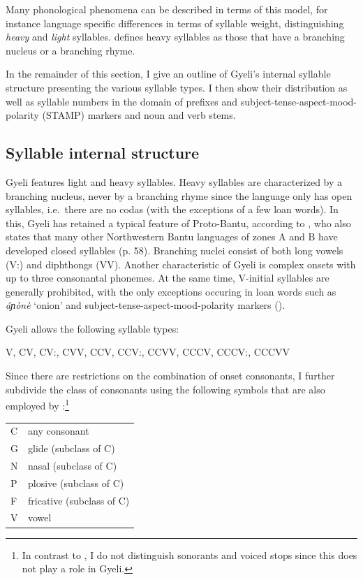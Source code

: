 Many phonological phenomena can be described in terms of this model, for instance language specific differences in terms of syllable weight, distinguishing {\itshape heavy} and {\itshape light} syllables. \citet{hyman85} defines heavy syllables as those that have a branching nucleus or a branching rhyme.

In the remainder of this section, I give an outline of Gyeli's internal syllable structure presenting the various syllable types. I then show their distribution as well as syllable numbers in the domain of prefixes and subject-tense-aspect-mood-polarity (STAMP) markers and noun and verb stems.


\subsection{Syllable internal structure}
\label{sec:SyllIntStr}

Gyeli features light and heavy syllables. Heavy syllables are characterized by a branching nucleus, never by a branching rhyme since the language only has open syllables, i.e.\ there are no codas (with the exceptions of a few loan words). In this, Gyeli has retained a typical feature of Proto-Bantu, according to \citet[43]{hyman2003}, who also states that many other Northwestern Bantu languages of zones A and B have developed closed syllables (p. 58).
Branching nuclei consist of both long vowels (V:) and diphthongs (VV). Another characteristic of Gyeli is complex onsets with up to three consonantal phonemes. At the same time, V-initial syllables are generally prohibited, with the only exceptions occuring in loan words such as {\itshape áɲònè} `onion' and subject-tense-aspect-mood-polarity markers ().

Gyeli allows the following syllable types:

\begin{center}V, CV, CV:, CVV, CCV, CCV:, CCVV, CCCV, CCCV:, CCCVV \end{center}

\noindent Since there are restrictions on the combination of onset consonants, I further subdivide the class of consonants using the following symbols that are also employed by \citet[41]{velde2008}:\footnote{In contrast to \citet[41]{velde2008}, I do not distinguish sonorants and voiced stops since this does not play a role in Gyeli.} 

\begin{center}
\begin{tabular}{ll}
C & any consonant \\
G & glide (subclass of C) \\
N & nasal (subclass of C) \\
P & plosive (subclass of C) \\
F & fricative (subclass of C) \\
V & vowel
\end{tabular}
\end{center}


